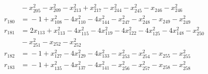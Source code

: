 \begin{align*}
&{}-x_{205}^{2} -x_{209}^{2} -x_{213}^{2} +x_{217}^{2} -x_{244}^{2} -x_{245}^{2} -x_{246} -x_{246}^{2} \\
r_{180} &={}-1 +x_{108}^{2} -4x_{110}^{2} -4x_{144}^{2} -x_{247}^{2} -x_{248}^{2} -x_{249} -x_{249}^{2} \\
r_{181} &={}2x_{113} +x_{113}^{2} -4x_{115}^{2} -4x_{119}^{2} -4x_{122}^{2} -4x_{125}^{2} -4x_{148}^{2} -x_{250}^{2} \\
&{}-x_{251}^{2} -x_{252} -x_{252}^{2} \\
r_{182} &={}-1 +x_{127}^{2} -4x_{129}^{2} -4x_{133}^{2} -x_{253}^{2} -x_{254}^{2} -x_{255} -x_{255}^{2} \\
r_{183} &={}-1 +x_{135}^{2} -4x_{137}^{2} -4x_{141}^{2} -x_{256}^{2} -x_{257}^{2} -x_{258} -x_{258}^{2}
\end{align*}
\endgroup
